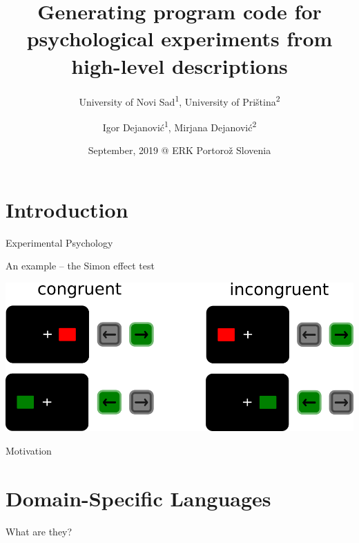 \documentclass[presentation]{beamer}
\author{Igor Dejanović\textsuperscript{1}, Mirjana Dejanović\textsuperscript{2}}
\date{September, 2019 @ ERK Portorož Slovenia}
\title{Generating program code for psychological experiments from high-level descriptions}
\subtitle{University of Novi Sad\textsuperscript{1}, University of Priština\textsuperscript{2}}
\begin{document}
\maketitle

\section*{Introduction}
\label{sec:orgead1246}
\begin{frame}[label={sec:orgc5c63ec}]{Experimental Psychology}
\end{frame}

\begin{frame}[label={sec:orgf695c52}]{An example -- the Simon effect test}
\begin{center}
\includegraphics[width=1\textwidth]{./images/simon_experiment.png}
\end{center} 
\end{frame}
\begin{frame}[label={sec:orgdf95a49}]{}
\begin{center}\huge{Motivation}\end{center}
\end{frame}

\section*{Domain-Specific Languages}
\label{sec:orgc3b4fe4}
\begin{frame}[label={sec:org6205fe3}]{What are they?}
\end{frame}
\end{document}
